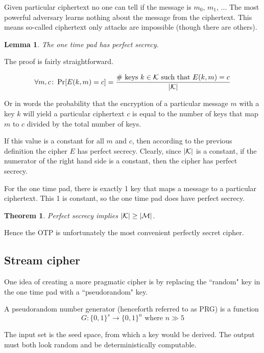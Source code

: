 \documentclass[10pt,a4paper]{report}
\newtheorem{theorem}{Theorem}[section]
\newtheorem{lemma}{Lemma}[section]
\begin{document}
Given particular ciphertext no one can tell if the message is $m_0$, $m_1$, $\ldots$ The most
powerful adversary learns nothing about the message from the ciphertext. This means so-called
ciphertext only attacks are impossible (though there are others).

\begin{lemma}
    The one time pad has perfect secrecy.
\end{lemma}

The proof is fairly straightforward.

    $$ \forall m, c \colon \operatorname{Pr}[E(k, m) = c] = \frac{\text{\# keys } k \in \mathcal{K}
    \text{ such that } E(k, m) = c}{\abs{\mathcal{K}}} $$

Or in words the probability that the encryption of a particular message $m$ with a key $k$ will
yield a particular ciphertext $c$ is equal to the number of keys that map $m$ to $c$ divided by the
total number of keys.

If this value is a constant for all $m$ and $c$, then according to the previous definition the
cipher $E$ has perfect secrecy. Clearly, since $\abs{\mathcal{K}}$ is a constant, if the numerator
of the right hand side is a constant, then the cipher has perfect secrecy.

For the one time pad, there is exactly 1 key that maps a message to a particular ciphertext. This 1
is constant, so the one time pad does have perfect secrecy.

\begin{theorem}
    \label{theorem:perfect_secrecy_hard}
    Perfect secrecy implies $\abs{\mathcal{K}} \geq \abs{\mathcal{M}}$.
\end{theorem}

Hence the OTP is unfortunately the most convenient perfectly secret cipher.

\subsection{Stream cipher}

One idea of creating a more pragmatic cipher is by replacing the ``random" key in the one time pad
with a ``pseudorandom" key.

A pseudorandom number generator (henceforth referred to as PRG) is a function
    $$ G \colon \{0, 1\}^s \to \{0, 1\}^n \text{ where } n \gg 5 $$

The input set is the seed space, from which a key would be derived. The output must both look
random and be deterministically computable.
\end{document}
